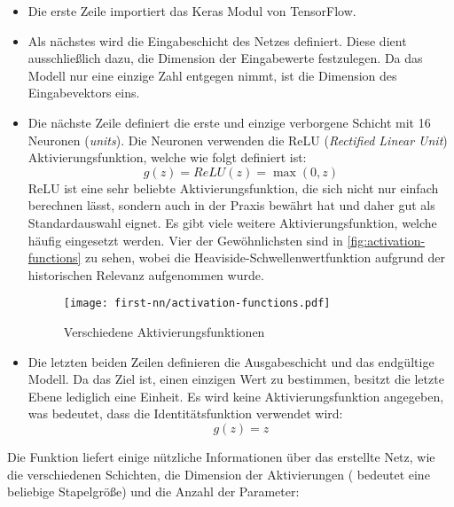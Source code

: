 \begin{itemize}
  \item Die erste Zeile importiert das Keras Modul von TensorFlow.
  \item Als nächstes wird die Eingabeschicht des Netzes definiert.
        Diese dient ausschließlich dazu, die Dimension der Eingabewerte festzulegen.
        Da das Modell nur eine einzige Zahl entgegen nimmt,
        ist die Dimension des Eingabevektors eins.
  \item Die nächste Zeile definiert die erste und einzige verborgene Schicht mit
        16 Neuronen (\textit{units}). Die Neuronen verwenden die ReLU
        (\textit{Rectified Linear Unit}) Aktivierungsfunktion, welche wie folgt
        definiert ist:
        \begin{equation}
          g(z) = ReLU(z) = \max(0, z)
        \end{equation}
        ReLU ist eine sehr beliebte Aktivierungsfunktion, die sich nicht
        nur einfach berechnen lässt, sondern auch in der Praxis bewährt hat
        und daher gut als Standardauswahl eignet. Es gibt viele
        weitere Aktivierungsfunktion, welche häufig eingesetzt werden.
        Vier der Gewöhnlichsten sind in \autoref{fig:activation-functions}
        zu sehen, wobei die Heaviside-Schwellenwertfunktion aufgrund der
        historischen Relevanz aufgenommen wurde.
        \begin{figure}[h!]
          \centering
          \texttt{[image: first-nn/activation-functions.pdf]}
          \caption{Verschiedene Aktivierungsfunktionen \parencite[292]{book:hands-on-ml}}
          \label{fig:activation-functions}
        \end{figure}
  \item Die letzten beiden Zeilen definieren die Ausgabeschicht und das endgültige
        Modell. Da das Ziel ist, einen einzigen Wert zu bestimmen, besitzt die letzte
        Ebene lediglich eine Einheit. Es wird keine Aktivierungsfunktion angegeben,
        was bedeutet, dass die Identitätsfunktion verwendet wird:
        \begin{equation}
          g(z) = z
        \end{equation}
\end{itemize}
Die  Funktion liefert einige nützliche Informationen
über das erstellte Netz, wie die verschiedenen Schichten, die Dimension
der Aktivierungen ( bedeutet eine beliebige Stapelgröße)
und die Anzahl der Parameter:
